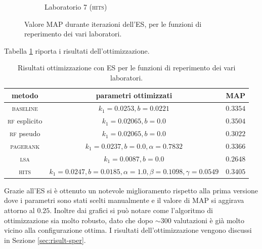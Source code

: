 \begin{figure}
\begin{subfigure}[htpb]{0.475\textwidth}
            \caption[]%
            {{\small Laboratorio 7 (\textsc{hits})}}    
            \label{fig:es_lab7}
        \end{subfigure}
        \caption[ The average and standard deviation of critical parameters ]
        {\small Valore MAP durante iterazioni dell'ES, per le funzioni di reperimento dei vari laboratori.} 
        \label{fig:es_all}
\end{figure}
Tabella \ref{tab:es} riporta i risultati dell'ottimizzazione.
\begin{table}[htpb]

\begin{center}
\begin{tabular}{|c|c|c|}
\hline
metodo & parametri ottimizzati & MAP \\
 \hline
\textsc{baseline} & $k_1 = 0.0253, b = 0.0221$ & $0.3354$ \\
\textsc{rf} esplicito & $k_1 = 0.02065, b = 0.0$ & $0.3504$ \\
\textsc{rf} pseudo & $k_1 = 0.02065, b = 0.0$ & $0.3022$ \\
\textsc{pagerank} & $k_1 = 0.0237, b = 0.0, \alpha=0.7832$ & $0.3366$ \\
\textsc{lsa} & $k_1 = 0.0087, b = 0.0$ & $0.2648$ \\
\textsc{hits} & $k_1 = 0.0247, b = 0.0185, \alpha=1.0, \beta=0.1098, \gamma=0.0549$ & $0.3405$ \\
\hline
\end{tabular}
\end{center}
\caption{Risultati ottimizzazione con ES per le funzioni di reperimento dei vari laboratori.}
\label{tab:es}
\end{table}

Grazie all'ES si \`e ottenuto un notevole miglioramento rispetto alla prima versione dove i parametri sono stati scelti manualmente e il valore di MAP si aggirava attorno al $0.25$. Inoltre dai grafici si pu\`o notare come l'algoritmo di ottimizzazione sia molto robusto, dato che dopo $\sim{300}$ valutazioni \`e gi\`a  molto vicino alla configurazione ottima. I risultati dell'ottimizzazione vengono discussi in Sezione \ref{sec:risult-sper}.

